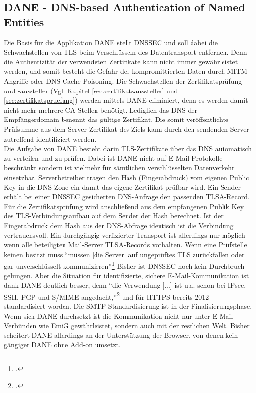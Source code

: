 \documentclass  [paper=a4,
				fontsize=12pt,
				listof=totoc,
				bibliography=totoc
				]{scrreprt}
\begin{document}
		\subsection{DANE - DNS-based Authentication of Named Entities}
		\label{subsec:dane}                                             
			Die Basis für die Applikation \ac{DANE} stellt \ac{DNSSEC} und soll dabei die Schwachstellen von \ac{TLS} beim Verschlüsseln des Datentransport entfernen. Denn die Authentizität der verwendeten Zertifikate kann nicht immer gewährleistet werden, und somit besteht die Gefahr der kompromittierten Daten durch \ac{MITM}-Angriffe oder \ac{DNS}-Cache-Poisoning.
			Die Schwachstellen der Zertifikatsprüfung und -aussteller (Vgl. Kapitel \ref{sec:zertifikatsaussteller} und \ref{sec:zertifikatspruefung}) werden mittels \ac{DANE} eliminiert, denn es werden damit nicht mehr mehrere CA-Stellen benötigt. Lediglich das DNS der Empfängerdomain benennt das gültige Zertifikat. Die somit  veröffentlichte Prüfsumme aus dem Server-Zertifikat des Ziels kann durch den sendenden Server zutreffend identifiziert werden.\medskip\\
			Die Aufgabe von \ac{DANE} besteht darin \ac{TLS}-Zertifikate über das \ac{DNS} automatisch zu verteilen und zu prüfen. Dabei ist \ac{DANE} nicht auf E-Mail Protokolle beschränkt sondern ist vielmehr für sämtlichen verschlüsselten Datenverkehr einsetzbar.
			Serverbetreiber tragen den Hash (Fingerabdruck) vom eigenen Public Key in die \ac{DNS}-Zone ein damit das eigene Zertifikat prüfbar wird. Ein Sender erhält bei einer \ac{DNSSEC} gesicherten \ac{DNS}-Anfrage den passenden \ac{TLSA}-Record. Für die Zertifikatsprüfung wird anschließend aus dem empfangenen Publik Key des \ac{TLS}-Verbindungsaufbau auf dem Sender der Hash berechnet. Ist der Fingerabdruck dem Hash aus der \ac{DNS}-Abfrage identisch ist die Verbindung vertrauensvoll.
			Ein durchgängig verfizierter Transport ist allerdings nur möglich wenn alle beteiligten Mail-Server \ac{TLSA}-Records vorhalten. Wenn eine Prüfstelle keinen besitzt muss ``müssen [die Server] auf ungeprüftes \ac{TLS} zurückfallen oder gar unverschlüsselt kommunizieren''\footcite[S. 197]{Koetter2014}
			Bisher ist \ac{DNSSEC} noch kein Durchbruch gelungen. Aber die Situation für identifizierte, sichere E-Mail-Kommunikation ist dank \ac{DANE} deutlich besser, denn ``die Verwendung [...] ist u.a. schon bei \ac{IPsec}, \ac{SSH}, \ac{PGP} und \ac{S/MIME} angedacht,''\footcite[S. 196]{Koetter2014} und für \ac{HTTPS} bereits 2012 standardisiert worden. Die \ac{SMTP}-Standardisierung ist in der Finalisierungsphase. Wenn sich \ac{DANE} durchsetzt ist die Kommunikation nicht nur unter E-Mail-Verbünden wie \ac{EmiG} gewährleistet, sondern auch mit der restlichen Welt. Bisher scheitert \ac{DANE} allerdings an der Unterstützung der Browser, von denen kein gängiger \ac{DANE} ohne Add-on umsetzt.
	\pagebreak
\end{document}
